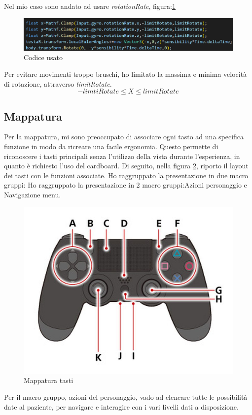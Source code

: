 \documentclass[
a4paper,
cleardoublepage=empty,
headings=twolinechapter,
numbers=autoenddot,
]{scrbook}
\begin{document}
	Nel mio caso sono andato ad usare \textit{rotationRate}, figura:\ref{fig:code_giro}
	\begin{figure}[H]
		\centering
		\includegraphics[width=1\linewidth]{image/codice_giro}
		\caption{Codice usato}
		\label{fig:code_giro}
	\end{figure}
	Per evitare movimenti troppo bruschi, ho limitato la massima e minima velocità di rotazione, attraverso \textit{limitRotate}.
	\begin{displaymath}
		-limtiRotate  \leq X \leq limitRotate
	\end{displaymath}
	\subsection{Mappatura}
    Per la mappatura, mi sono preoccupato di associare ogni tasto ad una specifica funzione in modo da ricreare una facile ergonomia. Questo permette di riconoscere i tasti principali senza l'utilizzo della vista durante l'esperienza, in quanto è richiesto l'uso del cardboard. Di seguito, nella figura \ref{fig:gamepad_tasti}, riporto il layout dei tasti con le funzioni associate. Ho raggruppato la presentazione in due macro gruppi:
	Ho raggruppato la presentazione in 2 macro gruppi:Azioni personaggio e Navigazione menu.
	\begin{figure}[H]
		\centering
		\includegraphics[width=0.6\linewidth]{image/gamepad_tasti}
		\caption{Mappatura tasti}
		\label{fig:gamepad_tasti}
	\end{figure}
	Per il macro gruppo, azioni del personaggio, vado ad elencare tutte le possibilità date al paziente, per navigare e interagire con i vari livelli dati a disposizione.
\end{document}
